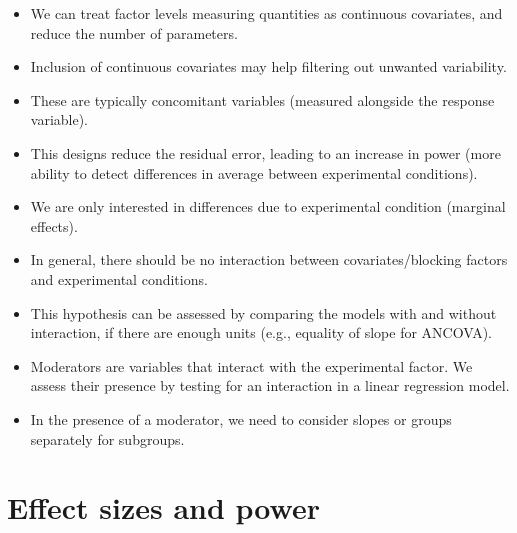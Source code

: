 \documentclass[
  11pt,
  letterpaper,
]{scrbook}
\providecommand{\tightlist}{%
  \setlength{\itemsep}{0pt}\setlength{\parskip}{0pt}}\usepackage{longtable,booktabs,array}
\theoremstyle{definition}
\theoremstyle{definition}
\theoremstyle{remark}
\begin{document}
\begin{tcolorbox}[enhanced jigsaw, bottomrule=.15mm, coltitle=black, colframe=quarto-callout-important-color-frame, left=2mm, opacityback=0, breakable, opacitybacktitle=0.6, rightrule=.15mm, toprule=.15mm, title=\textcolor{quarto-callout-important-color}{\faExclamation}\hspace{0.5em}{\textbf{Summary}}, toptitle=1mm, leftrule=.75mm, titlerule=0mm, colback=white, arc=.35mm, bottomtitle=1mm, colbacktitle=quarto-callout-important-color!10!white]

\begin{itemize}
\tightlist
\item
  We can treat factor levels measuring quantities as continuous
  covariates, and reduce the number of parameters.
\item
  Inclusion of continuous covariates may help filtering out unwanted
  variability.
\item
  These are typically concomitant variables (measured alongside the
  response variable).
\item
  This designs reduce the residual error, leading to an increase in
  power (more ability to detect differences in average between
  experimental conditions).
\item
  We are only interested in differences due to experimental condition
  (marginal effects).
\item
  In general, there should be no interaction between covariates/blocking
  factors and experimental conditions.
\item
  This hypothesis can be assessed by comparing the models with and
  without interaction, if there are enough units (e.g., equality of
  slope for ANCOVA).
\item
  Moderators are variables that interact with the experimental factor.
  We assess their presence by testing for an interaction in a linear
  regression model.
\item
  In the presence of a moderator, we need to consider slopes or groups
  separately for subgroups.
\end{itemize}

\end{tcolorbox}


\chapter{Effect sizes and power}\label{effect-sizes-and-power}
\end{document}
